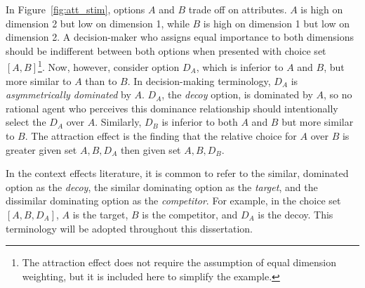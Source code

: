 In Figure~\ref{fig:att_stim}, options $A$ and $B$ trade off on attributes. $A$ is high on dimension 2 but low on dimension 1, while $B$ is high on dimension 1 but low on dimension 2. A decision-maker who assigns equal importance to both dimensions should be indifferent between both options when presented with choice set $[A,B]$\footnote{The attraction effect does not require the assumption of equal dimension weighting, but it is included here to simplify the example.}. Now, however, consider option $D_{A}$, which is inferior to $A$ and $B$, but more similar to $A$ than to $B$. In decision-making terminology, $D_{A}$ is \textit{asymmetrically dominated} by $A$. $D_{A}$, the \textit{decoy} option, is dominated by $A$, so no rational agent who perceives this dominance relationship should intentionally select the $D_{A}$ over $A$. Similarly, $D_{B}$ is inferior to both $A$ and $B$ but more similar to $B$. The attraction effect is the finding that the relative choice for $A$ over $B$ is greater given set ${A,B,D_{A}}$ then given set $A,B,D_{B}$. 

In the context effects literature, it is common to refer to the similar, dominated option as the \textit{decoy}, the similar dominating option as the \textit{target}, and the dissimilar dominating option as the \textit{competitor}. For example, in the choice set $[A,B,D_{A}]$, $A$ is the target, $B$ is the competitor, and $D_{A}$ is the decoy. This terminology will be adopted throughout this dissertation.

